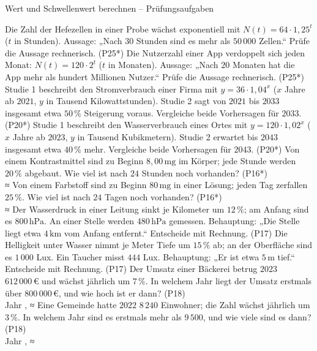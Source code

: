 \begin{aufgabe}{Wert und Schwellenwert berechnen – Prüfungsaufgaben}
\begin{teile}
\steil Die Zahl der Hefezellen in einer Probe wächst exponentiell mit $N(t) = 64 \cdot 1{,}25^t$ ($t$ in Stunden). Aussage: „Nach $30$ Stunden sind es mehr als $50\,000$ Zellen.“ Prüfe die Aussage rechnerisch. \hfill (P25*)
\steil Die Nutzerzahl einer App verdoppelt sich jeden Monat: $N(t) = 120 \cdot 2^t$ ($t$ in Monaten). Aussage: „Nach $20$ Monaten hat die App mehr als hundert Millionen Nutzer.“ Prüfe die Aussage rechnerisch. \hfill (P25*)
\steil Studie 1 beschreibt den Stromverbrauch einer Firma mit $y = 36 \cdot 1{,}04^x$ ($x$ Jahre ab $2021$, $y$ in Tausend Kilowattstunden). Studie 2 sagt von $2021$ bis $2033$ insgesamt etwa $50\,\%$ Steigerung voraus. Vergleiche beide Vorhersagen für $2033$. \hfill (P20*)
\steil Studie 1 beschreibt den Wasserverbrauch eines Ortes mit $y = 120 \cdot 1{,}02^x$ ($x$ Jahre ab $2023$, $y$ in Tausend Kubikmetern). Studie 2 erwartet bis $2043$ insgesamt etwa $40\,\%$ mehr. Vergleiche beide Vorhersagen für $2043$. \hfill (P20*)
\steil Von einem Kontrastmittel sind zu Beginn $8{,}00\,\mathrm{mg}$ im Körper; jede Stunde werden $20\,\%$ abgebaut. Wie viel ist nach $24$ Stunden noch vorhanden? \hfill (P16*) \\ ≈ \leerfeld[mg]
\steil Von einem Farbstoff sind zu Beginn $80\,\mathrm{mg}$ in einer Lösung; jeden Tag zerfallen $25\,\%$. Wie viel ist nach $24$ Tagen noch vorhanden? \hfill (P16*) \\ ≈ \leerfeld[mg]
\teil Der Wasserdruck in einer Leitung sinkt je Kilometer um $12\,\%$; am Anfang sind es $800\,\mathrm{hPa}$. An einer Stelle werden $480\,\mathrm{hPa}$ gemessen. Behauptung: „Die Stelle liegt etwa $4\,\mathrm{km}$ vom Anfang entfernt.“ Entscheide mit Rechnung. \hfill (P17)
\teil Die Helligkeit unter Wasser nimmt je Meter Tiefe um $15\,\%$ ab; an der Oberfläche sind es $1\,000$ Lux. Ein Taucher misst $444$ Lux. Behauptung: „Er ist etwa $5\,\mathrm{m}$ tief.“ Entscheide mit Rechnung. \hfill (P17)
\teil Der Umsatz einer Bäckerei betrug $2023$ $612\,000\,€$ und wächst jährlich um $7\,\%$. In welchem Jahr liegt der Umsatz erstmals über $800\,000\,€$, und wie hoch ist er dann? \hfill (P18) \\ Jahr \leerfeld , ≈ \leerfeld[€]
\teil Eine Gemeinde hatte $2022$ $8\,240$ Einwohner; die Zahl wächst jährlich um $3\,\%$. In welchem Jahr sind es erstmals mehr als $9\,500$, und wie viele sind es dann? \hfill (P18) \\ Jahr \leerfeld , ≈ \leerfeld
\end{teile}
\end{aufgabe}

